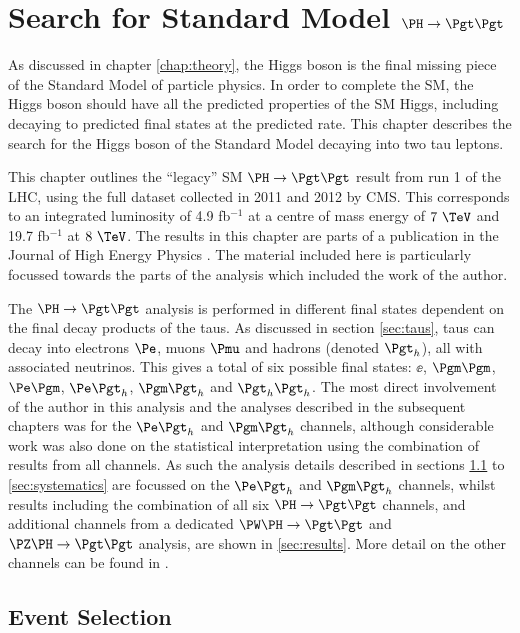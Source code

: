 \chapter{Search for Standard Model $\PH \to \Pgt\Pgt$}
\label{chap:httSM}

As discussed in chapter \ref{chap:theory}, the Higgs boson is the final missing 
piece of the Standard Model of particle physics. In order to complete the
\ac{SM}, the Higgs boson should have all the predicted properties of the
\ac{SM} Higgs, including decaying to predicted final states at the predicted rate. This
chapter describes the search for the Higgs boson of the Standard Model 
decaying into two tau leptons.

This chapter outlines the ``legacy'' \ac{SM} $\HToTauTau$ result from run 1 of the \ac{LHC}, using the
full dataset collected in 2011 and 2012 by CMS. This corresponds to an
integrated luminosity of 4.9 fb$^{-1}$ at a centre of mass energy of $7~\TeV$ and
19.7 fb$^{-1}$ at $8~\TeV$. The results in this chapter are parts of a publication 
in the Journal of High Energy Physics \cite{HIG-13-004}. The material included 
here is particularly focussed towards the parts of the analysis which 
included the work of the author. 

The $\PH \to \Pgt\Pgt$ analysis is performed in different final states dependent
on the final decay products of the taus. As discussed in section
\ref{sec:taus}, taus can decay into electrons $\Pe$,
muons $\Pmu$ and hadrons (denoted $\Pgth$), all with associated neutrinos.
This gives a total of six possible final states: $\ee$, $\mumu$, $\emu$,
$\etau$, $\mutau$ and $\tautau$. The most direct involvement of the author in this
analysis and the analyses described in the subsequent chapters was for the $\etau$ and
$\mutau$ channels, although considerable work was also done on the statistical
interpretation using the combination of results from all channels. 
As such the analysis details described in sections \ref{sec:eventSelection} to 
\ref{sec:systematics} are focussed on the
$\etau$ and $\mutau$ channels, whilst results including the combination of all
six $\HToTauTau$ channels, and additional channels from a dedicated $\PW\PH\to\Pgt\Pgt$ and
$\PZ\PH\to\Pgt\Pgt$ analysis, are shown in \ref{sec:results}. More detail on the other channels
can be found in \cite{HIG-13-004}. 

\section{Event Selection}
\label{sec:eventSelection}

